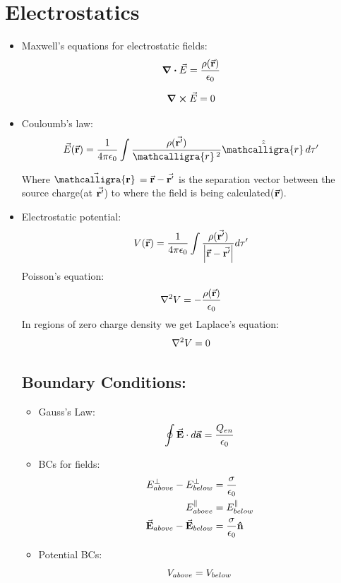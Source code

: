 \documentclass[12pt, oneside]{book}
\newcommand{\scriptr}{\mathcalligra{r}\,}
\begin{document}
\chapter{Electrostatics}
\begin{itemize}
\item	Maxwell's equations for electrostatic fields:
	\begin{equation}
		\div{\vec{E}}=\frac{\rho(\va{r})}{\epsilon_0}
	\end{equation}
	
	\begin{equation}
		\curl{\vec{E}}=0
	\end{equation}

\item Couloumb's law:
\begin{equation}
	\vec{E}(\va{r})=\dfrac{1}{4\pi\epsilon_0}\int\dfrac{\rho(\va{r'})}{ \scriptr^2}\hat{\hat{\scriptr}}d\tau'
\end{equation}

Where {\large $\va{\scriptr}=\va{r}-\va{r'}$} is the separation vector between the source charge(at $\va{r'}$) to where the field is being calculated($\va{r}$).

\item Electrostatic potential:
\begin{equation}
	V(\va{r})=\frac{1}{4\pi \epsilon_0}\int \frac{\rho(\va{r'})}{\abs{\va{r}-\va{r'}}}d\tau'\label{43}
\end{equation}
Poisson's equation: 
\begin{equation}
	\laplacian{V}=-\frac{\rho(\va{r})}{\epsilon_0}
\end{equation}
In regions of zero charge density we get Laplace's equation:
\begin{equation}
	\laplacian{V}=0
\end{equation}

\section{ Boundary Conditions:}

\begin{tcolorbox}
	\begin{itemize}
		\item Gauss's Law: 
		\begin{equation}
			\oint \va{E}\cdot d\va{a}=\frac{Q_{en}}{\epsilon_0}
		\end{equation}
		
		\item BCs for fields:
		\begin{align}
		E^{\perp}_{above}-E^{\perp}_{below}&=\frac{\sigma}{\epsilon_0} \\
		              E^{\parallel}_{above}&=E^{\parallel}_{below} \\
		      \va{E}_{above}-\va{E}_{below}&=\frac{\sigma}{\epsilon_0}\vu{n}
	\end{align} 
		 \item Potential BCs:
		 \begin{equation}
		 	V_{above}=V_{below}\\
		 \end{equation}
	

\end{itemize}
\end{tcolorbox}
\end{itemize}
\end{document}
